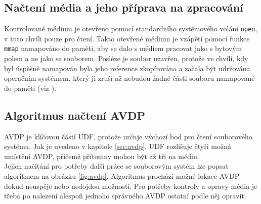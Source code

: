 \subsection{Načtení média a jeho příprava na zpracování}
Kontrolované médium je otevřeno pomocí standardního systémového volání \texttt{open}, v tuto chvíli pouze pro čtení. Takto otevřené médium je vzápětí pomocí funkce \texttt{mmap} namapováno do paměti, aby se dalo s médiem pracovat jako s bytovým polem a ne jako se souborem. Posléze je soubor uzavřen, protože ve chvíli, kdy byl úspěšně namapován byla jeho reference zkopírována a začala být udržována operačním systémem, který ji zruší až nebudou žadné části souboru namapované do paměti (viz \cite{posix-mmap}). 

\subsection{Algoritmus načtení AVDP}
AVDP je klíčovou částí UDF, protože určuje výchozí bod pro čtení souborového systému. Jak je uvedeno v kapitole \ref{sec:avdp}, UDF rozlišuje čtyři možná umístění AVDP, přičemž přítomny mohou být až tři na médiu.\\
Jejich načítání pro potřeby další práce se souborovým systém lze popsat algoritmem na obrázku \ref{fig:avdp}. Algoritmus prochází možné lokace AVDP dokud neuspěje nebo nedojdou možnosti. Pro potřeby kontroly a opravy média je třeba po nalezení alespoň jednoho správného AVDP ostatní podle něj opravit.
